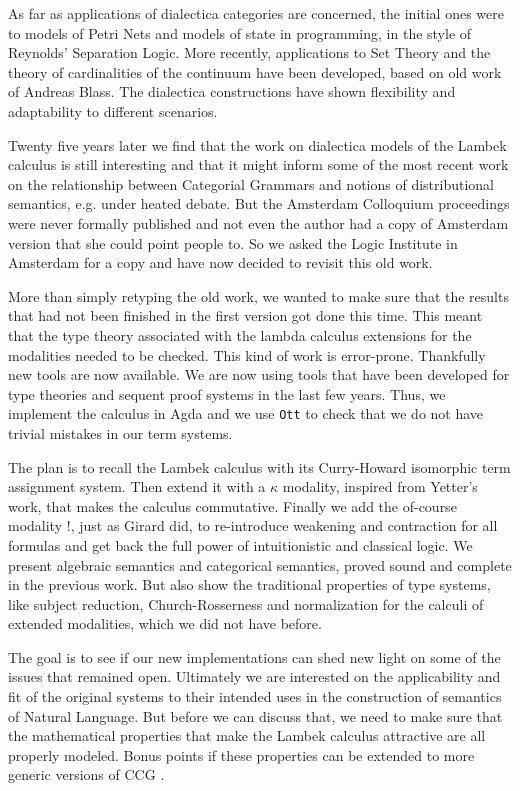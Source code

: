 \documentclass{article}
\begin{document}
As far as applications of dialectica categories are concerned, the initial ones were to models of Petri Nets and models of state in programming, in the style of Reynolds' Separation Logic. More recently, applications to Set Theory and the theory of cardinalities of the continuum have been developed, based on old work of Andreas Blass. The dialectica constructions have shown flexibility and adaptability to different scenarios.

Twenty five years later we find that the work on dialectica models of the Lambek calculus is still interesting and that it might inform some of the most recent work on the relationship between Categorial Grammars and notions of distributional semantics, e.g. \cite{coecke2013} under heated debate. But the Amsterdam Colloquium proceedings were never formally published and not even the author had a copy of Amsterdam version that she could point people to. So we asked the Logic Institute in Amsterdam for a copy and have now decided to revisit this old work. 

More than simply retyping the old work, we wanted to make sure that the results that had not been finished in the first version got done  this time. This meant that the type theory associated with the lambda calculus extensions for the modalities needed to be checked. This kind of work is error-prone. Thankfully new tools are now available. We are now using  tools that have been developed for type theories and sequent proof systems in the last few years. Thus, we implement the calculus in Agda
\cite{bove2009} and we use
\texttt{Ott} \cite{Sewell:2010} to check that we do not have trivial
mistakes in our term systems.

The plan is to recall the Lambek calculus with its Curry-Howard isomorphic term assignment system. Then extend it with a $\kappa$ modality, inspired from Yetter's work, that makes the calculus commutative. Finally we add the of-course modality $!$, just as Girard did, to  re-introduce weakening and contraction for all formulas and get back the full power of intuitionistic and classical logic. We present algebraic semantics and categorical semantics, proved sound and complete in the previous work. But also show the traditional properties of type systems, like subject reduction, Church-Rosserness and  normalization for the calculi of extended modalities, which we did not have before.

The goal is to see if our new
implementations can shed new light on some of the issues that remained
open. Ultimately we are  interested on the applicability and fit of the original systems to their intended uses in the construction of semantics of Natural Language. But before we can discuss that, we need to make sure that the mathematical properties that make the Lambek calculus attractive are all properly modeled. Bonus points if these properties can be extended to more generic versions of CCG \cite{lewis2014}. 




\end{document}
